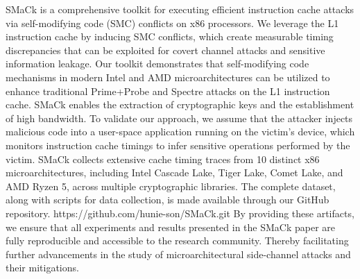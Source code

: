 SMaCk is a comprehensive toolkit for executing efficient instruction cache attacks via self-modifying code (SMC) conflicts on x86 processors. We leverage the L1 instruction cache by inducing SMC conflicts, which create measurable timing discrepancies that can be exploited for covert channel attacks and sensitive information leakage. Our toolkit demonstrates that self-modifying code mechanisms in modern Intel and AMD microarchitectures can be utilized to enhance traditional Prime+Probe and Spectre attacks on the L1 instruction cache. SMaCk enables the extraction of cryptographic keys and the establishment of high bandwidth.
To validate our approach, we assume that the attacker injects malicious code into a user-space application running on the victim's device, which monitors instruction cache timings to infer sensitive operations performed by the victim. SMaCk collects extensive cache timing traces from 10 distinct x86 microarchitectures, including Intel Cascade Lake, Tiger Lake, Comet Lake, and AMD Ryzen 5, across multiple cryptographic libraries. The complete dataset, along with scripts for data collection, is made available through our GitHub repository.
https://github.com/hunie-son/SMaCk.git
By providing these artifacts, we ensure that all experiments and results presented in the SMaCk paper are fully reproducible and accessible to the research community. Thereby facilitating further advancements in the study of microarchitectural side-channel attacks and their mitigations.
